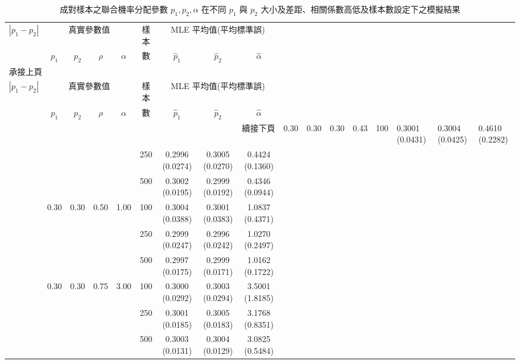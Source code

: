 \begin{small}
\begin{landscape}
\begin{longtable}{ccccccccc}
\caption{成對樣本之聯合機率分配參數 $p_1, p_2, \alpha$ 在不同 $p_1$ 與 $p_2$ 大小及差距、相關係數高低及樣本數設定下之模擬結果}
\label{tab:est_alpha}\\
\toprule
\multirow{2}{*}{$|p_1-p_2|$} &\multicolumn{4}{c}{真實參數值}      &樣本      & \multicolumn{3}{c}{MLE 平均值(平均標準誤)}  \\\cmidrule(lr){2-5} \cmidrule(lr){7-9}
     &$p_1$  &$p_2$  &$\rho$  &$\alpha$   &數        & $\hat{p}_1$     & $\hat{p}_2$             & $\hat{\alpha}$            \\\midrule
\endfirsthead
\multicolumn{9}{l}{承接上頁}\\[2pt]
\toprule
\multirow{2}{*}{$|p_1-p_2|$}  &\multicolumn{4}{c}{真實參數值}      &樣本      & \multicolumn{3}{c}{MLE 平均值(平均標準誤)}  \\\cmidrule(lr){2-5} \cmidrule(lr){7-9}
 &$p_1$  &$p_2$  &$\rho$  &$\alpha$   &數        & $\hat{p}_1$     & $\hat{p}_2$             & $\hat{\alpha}$            \\\midrule
\endhead
\midrule
\multicolumn{9}{r}{續接下頁}
\endfoot
\endlastfoot
0.0 &0.30   &   0.30    &   0.30    &   0.43    &   100 &   0.3001 (0.0431) &   0.3004 (0.0425) &   0.4610 (0.2282) \\
    &       &       &       &       &   250 &   0.2996 (0.0274) &   0.3005 (0.0270) &   0.4424 (0.1360) \\
    &       &       &       &       &   500 &   0.3002 (0.0195) &   0.2999 (0.0192) &   0.4346 (0.0944) \\
    &0.30   &   0.30    &   0.50    &   1.00    &   100 &   0.3004 (0.0388) &   0.3001 (0.0383) &   1.0837 (0.4371) \\
    &       &       &       &       &   250 &   0.2999 (0.0247) &   0.2996 (0.0242) &   1.0270 (0.2497) \\
    &       &       &       &       &   500 &   0.2997 (0.0175) &   0.2999 (0.0171) &   1.0162 (0.1722) \\
    &0.30   &   0.30    &   0.75    &   3.00    &   100 &   0.3000 (0.0292) &   0.3003 (0.0294) &   3.5001 (1.8185) \\
    &       &       &       &       &   250 &   0.3001 (0.0185) &   0.3005 (0.0183) &   3.1768 (0.8351) \\
    &       &       &       &       &   500 &   0.3003 (0.0131) &   0.3004 (0.0129) &   3.0825 (0.5484) \\

\end{longtable}
\end{landscape}
\end{small}

